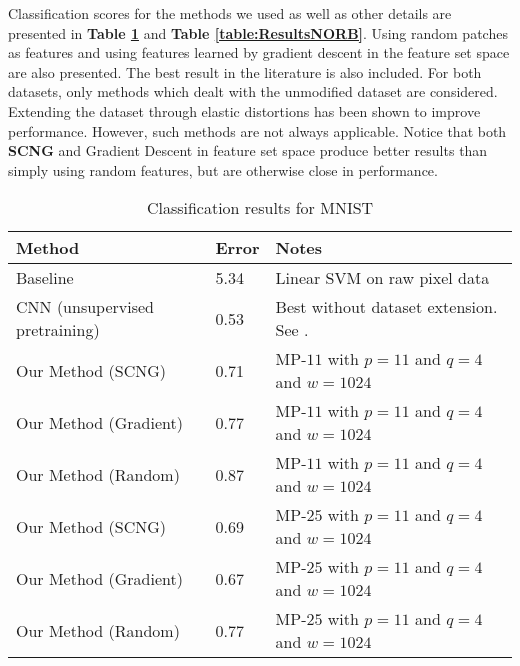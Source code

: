 \documentclass[runningheads,a4paper]{llncs}
\begin{document}
Classification scores for the methods we used as well as other details are presented in \textbf{Table \ref{table:ResultsMNIST}} and \textbf{Table \ref{table:ResultsNORB}}. Using random patches as features and using features learned by gradient descent \cite{sparse-coding-strategy-V1} in the feature set space are also presented. The best result in the literature is also included. For both datasets, only methods which dealt with the unmodified dataset are considered. Extending the dataset through elastic distortions \cite{best-practices-cnn} has been shown to improve performance. However, such methods are not always applicable. Notice that both \textbf{SCNG} and Gradient Descent in feature set space produce better results than simply using random features, but are otherwise close in performance.

\renewcommand{\arraystretch}{1.2}
\begin{table}[h!]
  \caption{Classification results for MNIST}
  \label{table:ResultsMNIST}
  \begin{tabularx}{\textwidth}{|l|l|X|}
    \hline
    \textbf{Method} & \textbf{Error} & \textbf{Notes} \\ \hline\hline
    Baseline & 5.34 & Linear SVM on raw pixel data \\ \hline
    CNN (unsupervised pretraining) & 0.53 & Best without dataset extension. See \cite{best-architecture-object-recognition}. \\ \hline
    Our Method (SCNG) & 0.71 & MP-$11$ with $p=11$ and $q=4$ and $w=1024$ \\ \hline
    Our Method (Gradient) & 0.77 & MP-$11$ with $p=11$ and $q=4$ and $w=1024$ \\ \hline
    Our Method (Random) & 0.87 & MP-$11$ with $p=11$ and $q=4$ and $w=1024$ \\ \hline
    Our Method (SCNG) & 0.69 & MP-$25$ with $p=11$ and $q=4$ and $w=1024$ \\ \hline
    Our Method (Gradient) & 0.67 & MP-$25$ with $p=11$ and $q=4$ and $w=1024$ \\ \hline
    Our Method (Random) & 0.77 & MP-$25$ with $p=11$ and $q=4$ and $w=1024$ \\ \hline
  \end{tabularx}
\end{table}
\renewcommand{\arraystretch}{1.0}
\end{document}
